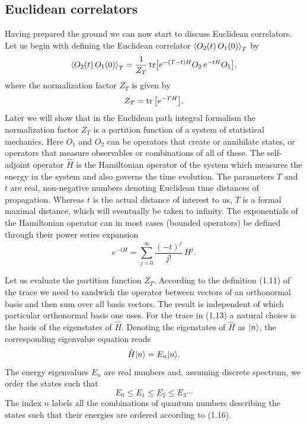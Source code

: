 \subsection{Euclidean correlators}

Having prepared the ground we can now start to discuss Euclidean correlators.
Let us begin with defining the Euclidean correlator
$\left\langle O_2(t)\,O_1(0) \right\rangle_T$ by
\begin{equation}
  \left\langle O_2(t)\,O_1(0) \right\rangle_T
  = \frac{1}{Z_T}\operatorname{tr}\!\big[e^{-(T-t)H}O_2\,e^{-tH}O_1\big],
\end{equation}
where the normalization factor $Z_T$ is given by
\begin{equation}
  Z_T = \operatorname{tr}\big[e^{-TH}\big].
\end{equation}
Later we will show that in the Euclidean path integral formalism the
normalization factor $Z_T$ is a partition function of a system of statistical
mechanics. Here $O_1$ and $O_2$ can be operators that create or annihilate
states, or operators that measure observables or combinations of all of these.
The self-adjoint operator $\hat{H}$ is the Hamiltonian operator of the system
which measures the energy in the system and also governs the time evolution.
The parameters $T$ and $t$ are real, non-negative numbers denoting Euclidean
time distances of propagation. Whereas $t$ is the actual distance of interest
to us, $T$ is a formal maximal distance, which will eventually be taken to
infinity. The exponentials of the Hamiltonian operator can in most cases
(bounded operators) be defined through their power series expansion
\begin{equation}
  e^{-tH} = \sum_{j=0}^{\infty}\frac{(-t)^j}{j!}\,H^j.
\end{equation}

Let us evaluate the partition function $Z_T$. According to the definition (1.11)
of the trace we need to sandwich the operator between vectors of an orthonormal
basis and then sum over all basis vectors. The result is independent of which
particular orthonormal basis one uses. For the trace in (1.13) a natural choice
is the basis of the eigenstates of $\hat{H}$. Denoting the eigenstates of
$\hat{H}$ as $|n\rangle$, the corresponding eigenvalue equation reads
\begin{equation}
  \hat{H}|n\rangle = E_n|n\rangle.
\end{equation}
The energy eigenvalues $E_n$ are real numbers and, assuming discrete spectrum,
we order the states such that
\begin{equation}
  E_0 \leq E_1 \leq E_2 \leq E_3 \cdots
\end{equation}
The index $n$ labels all the combinations of quantum numbers describing the
states such that their energies are ordered according to (1.16).

